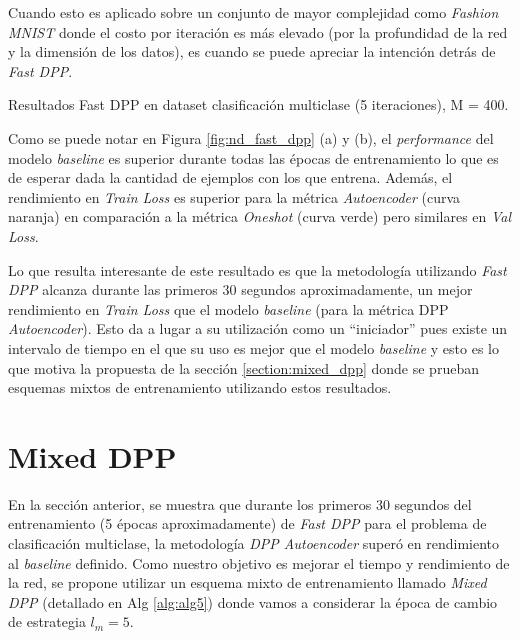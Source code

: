 \vspace{0.2cm}

Cuando esto es aplicado sobre un conjunto de mayor complejidad como \textit{Fashion MNIST} donde el costo por iteración es más elevado (por la profundidad de la red y la dimensión de los datos), es cuando se puede apreciar la intención detrás de \textit{Fast DPP}.

\begin{images}[\label{fig:nd_fast_dpp}]{\centering Resultados Fast DPP en dataset clasificación multiclase (5 iteraciones), M = 400.}

\end{images}

Como se puede notar en Figura \ref{fig:nd_fast_dpp} (a) y (b), el \textit{performance} del modelo \textit{baseline} es superior durante todas las épocas de entrenamiento lo que es de esperar dada la cantidad de ejemplos con los que entrena. Además, el rendimiento en \textit{Train Loss} es superior para la métrica \textit{Autoencoder} (curva naranja) en comparación a la métrica \textit{Oneshot} (curva verde) pero similares en \textit{Val Loss}.

\vspace{0.2cm}

Lo que resulta interesante de este resultado es que la metodología utilizando \textit{Fast DPP} alcanza durante las primeros 30 segundos aproximadamente, un mejor rendimiento en \textit{Train Loss} que el modelo \textit{baseline} (para la métrica DPP \textit{Autoencoder}). Esto da a lugar a su utilización como un ``iniciador'' pues existe un intervalo de tiempo en el que su uso es mejor que el modelo \textit{baseline} y esto es lo que motiva la propuesta de la sección \ref{section:mixed_dpp} donde se prueban esquemas mixtos de entrenamiento utilizando estos resultados. 

\section{Mixed DPP}

En la sección anterior, se muestra que durante los primeros 30 segundos del entrenamiento (5 épocas aproximadamente) de \textit{Fast DPP} para el problema de clasificación multiclase, la metodología \textit{DPP Autoencoder} superó en rendimiento al \textit{baseline} definido. Como nuestro objetivo es mejorar el tiempo y rendimiento de la red, se propone utilizar un esquema mixto de entrenamiento llamado \textit{Mixed DPP} (detallado en Alg \ref{alg:alg5}) donde vamos a considerar la época de cambio de estrategia $l_m = 5$.

